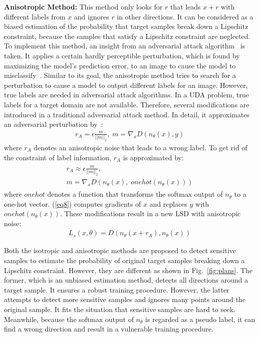 \documentclass[journal,twocolumn]{IEEEtran}
\theoremstyle{definition}
\begin{document}
{\bf Anisotropic Method:} This method only looks for $r$ that leads $x+r$ with different labels from $x$ and ignores $r$ in other directions. It can be considered as a biased estimation of the probability that target samples break down a Lipschitz constraint, because the samples that satisfy a Lipschitz constraint are neglected. To implement this method, an insight from an adversarial attack algorithm~\cite{goodfellow2014explaining} is taken. It applies a certain hardly perceptible perturbation, which is found by maximizing the model's prediction error, to an image to cause the model to misclassify~\cite{goodfellow2014explaining}. Similar to its goal, the anisotropic method tries to search for a perturbation to cause a model to output different labels for an image. However, true labels are needed in adversarial attack algorithms. In a UDA problem, true labels for a target domain are not available. Therefore, several modifications are introduced in a traditional adversarial attack method. In detail, it approximates an adversarial perturbation by~\cite{goodfellow2014explaining}:
\begin{align}
r_{A}=\epsilon\frac{m}{||m||_2},\;m = \nabla_{x}D(n_\theta(x),y)
\end{align}
where $r_{A}$ denotes an anisotropic noise that leads to a wrong label. To get rid of the constraint of label information, $r_{A}$ is approximated by:
\begin{align}
\begin{gathered}
r_{A}\approx\epsilon\frac{m}{||m||_2},\\
m = \nabla_{x}D(n_\theta(x),\;onehot(n_\theta(x)))\label{eq8}
\end{gathered}
\end{align}
where $onehot$ denotes a function that transforms the softmax output of $n_\theta$ to a one-hot vector. (\ref{eq8}) computes gradients of $x$ and replaces $y$ with $onehot(n_\theta(x))$. These modifications result in a new LSD with anisotropic noise:
\begin{align}
L_s(x,\theta)=D(n_\theta(x+r_{A}),n_\theta(x))\label{eq9}
\end{align}

Both the isotropic and anisotropic methods are proposed to detect sensitive samples to estimate the probability of original target samples breaking down a Lipschitz constraint. However, they are different as shown in Fig.~\ref{fig:plans}. The former, which is an unbiased estimation method, detects all directions around a target sample. It ensures a robust training procedure. However, the latter attempts to detect more sensitive samples and ignores many points around the original sample. It fits the situation that sensitive samples are hard to seek. Meanwhile, because the softmax output of $n_{\theta}$ is regarded as a pseudo label, it can find a wrong direction and result in a vulnerable training procedure.
\end{document}
